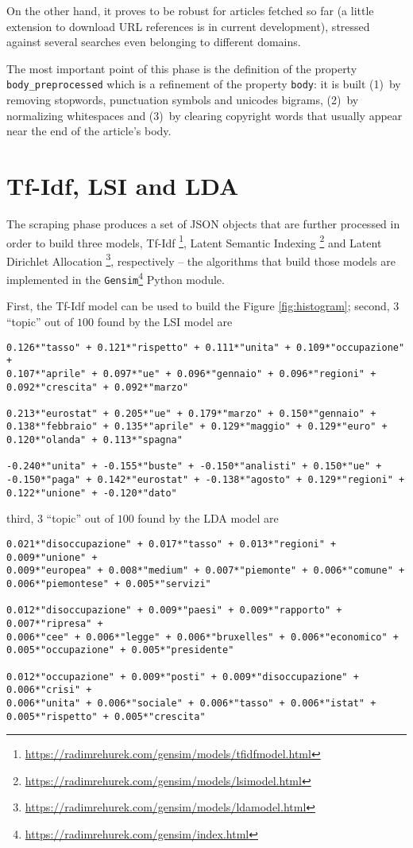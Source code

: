 \documentclass[a4paper]{article}
\begin{document}
On the other hand, it proves to be robust for articles fetched so far (a little
extension to download URL references is in current development), stressed
against several searches even belonging to different domains.

The most important point of this phase is the definition of the property
\verb|body_preprocessed| which is a refinement of the property \verb|body|: it
is built (1)~by removing stopwords, punctuation symbols and unicodes bigrams,
(2)~by normalizing whitespaces and (3)~by clearing copyright words that usually
appear near the end of the article's body.

\section{Tf-Idf, LSI and LDA}

The scraping phase produces a set of JSON objects that are further processed in
order to build three models, Tf-Idf
\footnote{\url{https://radimrehurek.com/gensim/models/tfidfmodel.html}}, Latent
Semantic Indexing
\footnote{\url{https://radimrehurek.com/gensim/models/lsimodel.html}} and
Latent Dirichlet Allocation
\footnote{\url{https://radimrehurek.com/gensim/models/ldamodel.html}},
respectively -- the algorithms that build those models are implemented in the
\verb|Gensim|\footnote{\url{https://radimrehurek.com/gensim/index.html}} Python
module. 

First, the Tf-Idf model can be used to build the Figure \ref{fig:histogram};
second, $3$ ``topic'' out of $100$ found by the LSI model are
\begin{Verbatim}[fontsize=\footnotesize]
0.126*"tasso" + 0.121*"rispetto" + 0.111*"unita" + 0.109*"occupazione" + 
0.107*"aprile" + 0.097*"ue" + 0.096*"gennaio" + 0.096*"regioni" + 
0.092*"crescita" + 0.092*"marzo"

0.213*"eurostat" + 0.205*"ue" + 0.179*"marzo" + 0.150*"gennaio" + 
0.138*"febbraio" + 0.135*"aprile" + 0.129*"maggio" + 0.129*"euro" + 
0.120*"olanda" + 0.113*"spagna"

-0.240*"unita" + -0.155*"buste" + -0.150*"analisti" + 0.150*"ue" + 
-0.150*"paga" + 0.142*"eurostat" + -0.138*"agosto" + 0.129*"regioni" + 
0.122*"unione" + -0.120*"dato"
\end{Verbatim}
third, $3$ ``topic'' out of $100$ found by the LDA model are
\begin{Verbatim}[fontsize=\footnotesize]
0.021*"disoccupazione" + 0.017*"tasso" + 0.013*"regioni" + 0.009*"unione" + 
0.009*"europea" + 0.008*"medium" + 0.007*"piemonte" + 0.006*"comune" + 
0.006*"piemontese" + 0.005*"servizi"

0.012*"disoccupazione" + 0.009*"paesi" + 0.009*"rapporto" + 0.007*"ripresa" + 
0.006*"cee" + 0.006*"legge" + 0.006*"bruxelles" + 0.006*"economico" + 
0.005*"occupazione" + 0.005*"presidente"

0.012*"occupazione" + 0.009*"posti" + 0.009*"disoccupazione" + 0.006*"crisi" + 
0.006*"unita" + 0.006*"sociale" + 0.006*"tasso" + 0.006*"istat" +
0.005*"rispetto" + 0.005*"crescita"
\end{Verbatim}
\end{document}
